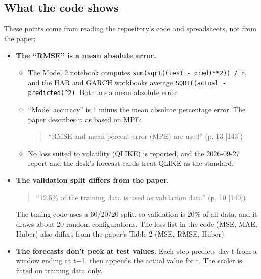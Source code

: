 \documentclass{article}
\begin{document}
\subsection{What the code shows}

These points come from reading the repository's code and spreadsheets, not from the paper:

\begin{itemize}

\item \textbf{The ``RMSE'' is a mean absolute error.}

\begin{itemize}

\item The Model 2 notebook computes \texttt{sum(sqrt((test -\allowbreak{} pred)**2)) /\allowbreak{} n}, and the HAR and GARCH workbooks average \texttt{SQRT((actual -\allowbreak{} predicted)\textasciicircum{}2)}. Both are a mean absolute error.

\item ``Model accuracy'' is 1 minus the mean absolute percentage error. The paper describes it as based on MPE:

\begin{quote}``RMSE and mean percent error (MPE) are used'' (p. 13 [143])\end{quote}

\item No loss suited to volatility (QLIKE) is reported, and the 2026-09-27 report and the desk's forecast cards treat QLIKE as the standard.

\end{itemize}

\item \textbf{The validation split differs from the paper.}

\begin{quote}``12.5\% of the training data is used as validation data'' (p. 10 [140])\end{quote}

The tuning code uses a 60/\allowbreak{}20/\allowbreak{}20 split, so validation is 20\% of all data, and it draws about 20 random configurations. The loss list in the code (MSE, MAE, Huber) also differs from the paper's Table 2 (MSE, RMSE, Huber).

\item \textbf{The forecasts don't peek at test values.} Each step predicts day t from a window ending at t\ensuremath{-}1, then appends the actual value for t. The scaler is fitted on training data only.


\end{itemize}
\end{document}
